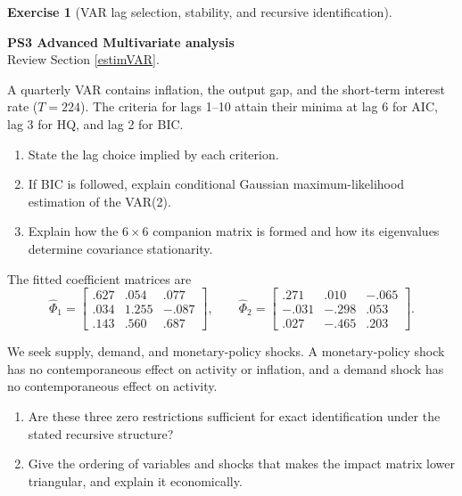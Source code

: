 \documentclass[
  11pt,
]{book}
\providecommand{\tightlist}{%
  \setlength{\itemsep}{0pt}\setlength{\parskip}{0pt}}
\theoremstyle{definition}
\theoremstyle{definition}
\theoremstyle{definition}
\newtheorem{exercise}{Exercise}[chapter]
\theoremstyle{definition}
\theoremstyle{remark}
\begin{document}

\begin{exercisebox}

\begin{exercise}[VAR lag selection, stability, and recursive identification]
\protect\hypertarget{exr:ex-var-model}{}\label{exr:ex-var-model}

\textbf{PS3 \textbar{} Advanced \textbar{} Multivariate analysis}\\
Review Section \ref{estimVAR}.

A quarterly VAR contains inflation, the output gap, and the short-term interest rate (\(T=224\)). The criteria for lags 1--10 attain their minima at lag 6 for AIC, lag 3 for HQ, and lag 2 for BIC.

\begin{enumerate}
\def\labelenumi{\arabic{enumi}.}
\tightlist
\item
  State the lag choice implied by each criterion.
\item
  If BIC is followed, explain conditional Gaussian maximum-likelihood estimation of the VAR(2).
\item
  Explain how the \(6\times6\) companion matrix is formed and how its eigenvalues determine covariance stationarity.
\end{enumerate}

The fitted coefficient matrices are
\[
\widehat\Phi_1=\begin{bmatrix}.627&.054&.077\\.034&1.255&-.087\\.143&.560&.687\end{bmatrix},\qquad
\widehat\Phi_2=\begin{bmatrix}.271&.010&-.065\\-.031&-.298&.053\\.027&-.465&.203\end{bmatrix}.
\]

We seek supply, demand, and monetary-policy shocks. A monetary-policy shock has no contemporaneous effect on activity or inflation, and a demand shock has no contemporaneous effect on activity.

\begin{enumerate}
\def\labelenumi{\arabic{enumi}.}
\setcounter{enumi}{3}
\tightlist
\item
  Are these three zero restrictions sufficient for exact identification under the stated recursive structure?
\item
  Give the ordering of variables and shocks that makes the impact matrix lower triangular, and explain it economically.
\end{enumerate}

\end{exercise}

\end{exercisebox}
\end{document}
